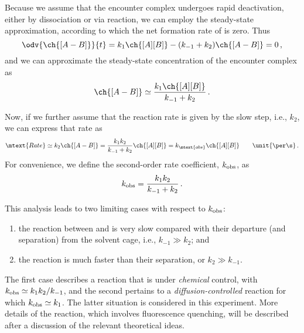 Because we assume that the encounter complex undergoes rapid deactivation, either by
dissociation or via reaction, we can employ the steady-state approximation, according to which
the net formation rate of  is zero. Thus
\[
	\odv{\ch{[A-B]}}{t} = k_1 \ch{[A][B]} - (k_{-1} + k_2)\ch{[A-B]} = 0 \, ,
\]
and we can approximate the steady-state concentration of the encounter complex as 
\[
	\ch{[A-B]} \simeq \frac{k_1\ch{[A][B]}}{k_{-1}+k_2} \, .
\]

Now, if we further assume that the reaction rate is given by the slow step, i.e., \( k_2 \)\ch{[A-B]}, we can express that rate as
\[
	\mtext{Rate} \simeq k_2 \ch{[A-B]} = \frac{k_1 k_2}{k_{-1} + k_2} \ch{[A][B]} = k_\mtext{obs}\ch{[A][B]} \qquad \unit{ \per \s} \, .
\]
For convenience, we define the second-order rate coefficient, \( k_\textup{obs} \), as 
\begin{equation}
	k_\textup{obs} = \frac{k_1 k_2}{k_{-1} + k_2} \, .
	\label{eq:k_obs}
\end{equation}

This analysis leads to two limiting cases with respect to \( k_\textup{obs} \): 
\begin{enumerate}
	\item the reaction between  and  is very slow compared with their departure (and separation) from the solvent cage, i.e., \( k_{-1} \gg k_2 \); and 
	\item the  reaction is much faster than their separation, or \( k_2 \gg k_{-1} \). 
\end{enumerate}
The first case describes a reaction that is under \emph{chemical} control, with \( k_\textup{obs} \simeq k_1 k_2 / k_{-1} \), and the second pertains to a \emph{diffusion-controlled} reaction for which \( k_\textup{obs} \simeq k_1 \). 
The latter situation is considered in this experiment. More details of the reaction, which involves fluorescence quenching, will be described after a discussion of the relevant theoretical ideas. 

